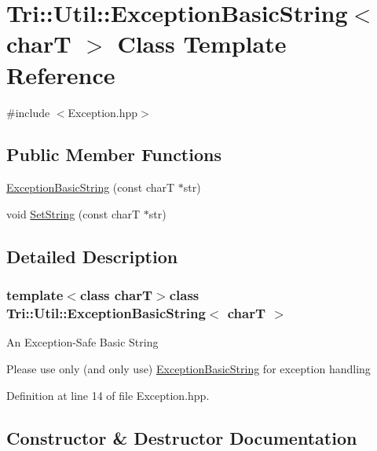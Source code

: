 \hypertarget{class_tri_1_1_util_1_1_exception_basic_string}{}\section{Tri\+:\+:Util\+:\+:Exception\+Basic\+String$<$ char\+T $>$ Class Template Reference}
\label{class_tri_1_1_util_1_1_exception_basic_string}


{\ttfamily \#include $<$Exception.\+hpp$>$}

\subsection*{Public Member Functions}
\begin{DoxyCompactItemize}
\item 
\hyperlink{class_tri_1_1_util_1_1_exception_basic_string_add985754cc7acbded214a7870acf986b}{Exception\+Basic\+String} (const char\+T $\ast$str)
\item 
void \hyperlink{class_tri_1_1_util_1_1_exception_basic_string_a26655923c1d013aac7620f0f50a8e7ef}{Set\+String} (const char\+T $\ast$str)
\end{DoxyCompactItemize}


\subsection{Detailed Description}
\subsubsection*{template$<$class char\+T$>$class Tri\+::\+Util\+::\+Exception\+Basic\+String$<$ char\+T $>$}

An Exception-\/\+Safe Basic String

Please use only (and only use) \hyperlink{class_tri_1_1_util_1_1_exception_basic_string}{Exception\+Basic\+String} for exception handling 

Definition at line 14 of file Exception.\+hpp.



\subsection{Constructor \& Destructor Documentation}
\hypertarget{class_tri_1_1_util_1_1_exception_basic_string_add985754cc7acbded214a7870acf986b}{}
